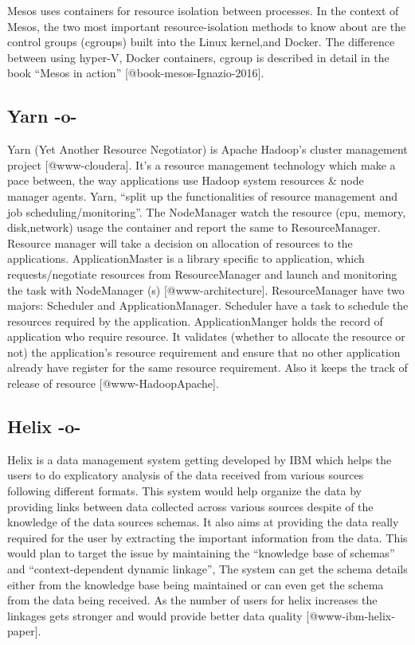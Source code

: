 Mesos uses containers for resource isolation between processes. In the
context of Mesos, the two most important resource-isolation methods to
know about are the control groups (cgroups) built into the Linux
kernel,and Docker. The difference between using hyper-V, Docker
containers, cgroup is described in detail in the book ``Mesos in
action'' [@book-mesos-Ignazio-2016].




\subsection{Yarn -o-}

Yarn (Yet Another Resource Negotiator) is Apache Hadoop's cluster
management project [@www-cloudera]. It's a resource management
technology which make a pace between, the way applications use Hadoop
system resources \& node manager agents. Yarn, ``split up the
functionalities of resource management and job
scheduling/monitoring''. The NodeManager watch the resource (cpu,
memory, disk,network) usage the container and report the same to
ResourceManager. Resource manager will take a decision on allocation
of resources to the applications. ApplicationMaster is a library
specific to application, which requests/negotiate resources from
ResourceManager and launch and monitoring the task with NodeManager
(s) [@www-architecture].  ResourceManager have two majors:
Scheduler and ApplicationManager. Scheduler have a task to schedule
the resources required by the application. ApplicationManger holds the
record of application who require resource. It validates (whether to
allocate the resource or not) the application's resource requirement
and ensure that no other application already have register for the
same resource requirement. Also it keeps the track of release of
resource [@www-HadoopApache].



\subsection{Helix -o-}

Helix is a data management system getting developed by IBM which helps
the users to do explicatory analysis of the data received from various
sources following different formats. This system would help organize
the data by providing links between data collected across various
sources despite of the knowledge of the data sources schemas. It also
aims at providing the data really required for the user by extracting
the important information from the data. This would plan to target the
issue by maintaining the ``knowledge base of schemas'' and
``context-dependent dynamic linkage'', The system can get the schema
details either from the knowledge base being maintained or can even
get the schema from the data being received. As the number of users
for helix increases the linkages gets stronger and would provide
better data quality [@www-ibm-helix-paper].


